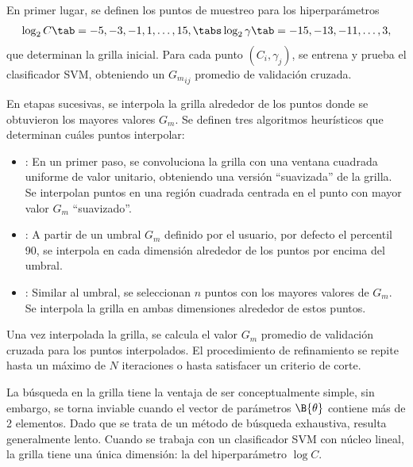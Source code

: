 En primer lugar, se definen los puntos de muestreo para los
hiperparámetros
%
\begin{align}
  \label{initial-grid}
  \log_2 C     \tab= -5, -3, -1, 1, \ldots, 15, \tabs
  \log_2\gamma \tab= -15,-13, -11, \ldots, 3,
\end{align}
%
que determinan la grilla inicial. Para cada punto $(C_i,\gamma_j)$, se
entrena y prueba el clasificador SVM, obteniendo un ${G_m}_{ij}$
promedio de validación cruzada.

En etapas sucesivas, se interpola la grilla alrededor de los puntos
donde se obtuvieron los mayores valores $G_m$. Se definen tres
algoritmos heurísticos que determinan cuáles puntos interpolar:
%
\begin{itemize}
%
\item {}: En un primer paso, se convoluciona la grilla con una
  ventana cuadrada uniforme de valor unitario, obteniendo una versión
  ``suavizada'' de la grilla. Se interpolan puntos en una región
  cuadrada centrada en el punto con mayor valor $G_m$ ``suavizado''.
%
\item {}: A partir de un umbral $G_m$ definido por el usuario,
  por defecto el percentil 90, se interpola en cada dimensión
  alrededor de los puntos por encima del umbral.
%
\item {}: Similar al umbral, se seleccionan $n$ puntos
  con los mayores valores de $G_m$. Se interpola la grilla en ambas
  dimensiones alrededor de estos puntos.
%
\end{itemize}
%
Una vez interpolada la grilla, se calcula el valor $G_m$ promedio de
validación cruzada para los puntos interpolados. El procedimiento de
refinamiento se repite hasta un máximo de $N$ iteraciones o hasta
satisfacer un criterio de corte.

La búsqueda en la grilla tiene la ventaja de ser conceptualmente
simple, sin embargo, se torna inviable cuando el vector de parámetros
$\B{\theta}$ contiene más de 2 elementos. Dado que se trata de un
método de búsqueda exhaustiva, resulta generalmente lento.  Cuando se
trabaja con un clasificador SVM con núcleo lineal, la grilla
tiene una única dimensión: la del hiperparámetro $\log C$.
